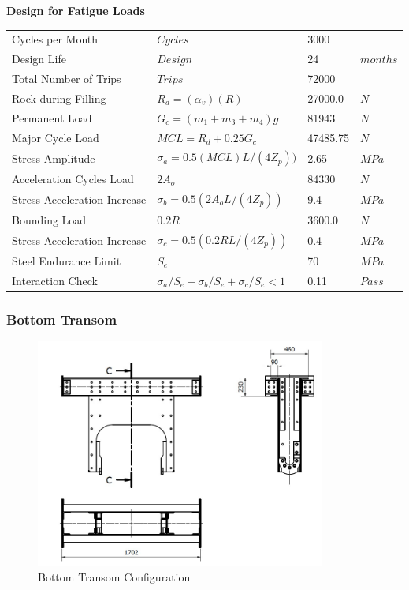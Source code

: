 \documentclass{article}%
\begin{document}
\textbf{Design for Fatigue Loads}%
\begin{flushleft}%
\begin{minipage}{\textwidth}%
\flushleft%
\begin{tabular}{l l l l}%
Cycles per Month&$Cycles$&3000&\\%
Design Life&$Design$&24&$months$\\%
Total Number of Trips&$Trips$&72000&\\%
Rock during Filling&$R_d = (\alpha_v)(R)$&27000.0&$N$\\%
Permanent Load&$G_c = (m_1 + m_3 + m_4)g$&81943&$N$\\%
Major Cycle Load&$MCL = R_d + 0.25G_c$&47485.75&$N$\\%
Stress Amplitude&$\sigma_a = 0.5 (MCL) L/(4 Z_p))$&2.65&$MPa$\\%
Acceleration Cycles Load&$2A_o$&84330&$N$\\%
Stress Acceleration Increase&$\sigma_b = 0.5 (2 A_o L/(4 Z_p))$&9.4&$MPa$\\%
Bounding Load&$0.2R$&3600.0&$N$\\%
Stress Acceleration Increase&$\sigma_c = 0.5 (0.2 R L/(4 Z_p))$&0.4&$MPa$\\%
Steel Endurance Limit&$S_e$&70&$MPa$\\%
Interaction Check&$\sigma_a/S_e + \sigma_b/S_e + \sigma_c/S_e < 1$&0.11&$Pass$\\%
\end{tabular}%
\end{minipage}%
\end{flushleft}

%
\newpage%
\subsubsection{Bottom Transom}%
\label{ssubsec:BottomTransom}%


\begin{figure}[h!]%
\includegraphics[width=360px]{Bottom_Transom.jpg}%
\centering%
\caption{Bottom Transom Configuration}%
\centering%
\end{figure}
\end{document}

